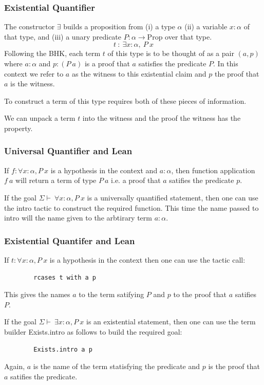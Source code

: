 \documentclass{beamer}
\theoremstyle{indentDefn} \newtheorem{defn}[]{Definition}
\begin{document}
\begin{frame}
	\frametitle{Existential Quantifier}
	
	The constructor $\exists$ builds a proposition from (i) a type $\alpha$ (ii) a variable $x : \alpha$ of that type, and (iii) a unary predicate $P : \alpha \to \text{Prop}$ over that type.
	$$t \ : \ \exists x: \alpha, \ P \ x$$
	Following the BHK, each term $t$ of this type is to be thought of as a pair $(a, p)$ where $a : \alpha$ and $p : (P \ a)$ is a proof that $a$ satisfies the predicate $P$. In this context we refer to $a$ as the witness to this existential claim and $p$ the proof that $a$ is the witness. 
	
	To construct a term of this type requires both of these pieces of information. 
	
	We can unpack a term $t$ into the witness and the proof the witness has the property. 

\end{frame}

\begin{frame}
	\frametitle{Universal Quantifier and Lean}
	
	If $f : \forall x: \alpha, P \ x$ is a hypothesis in the context and $a : \alpha$, then function application $f \ a$ will return a term of type $P \ a$ i.e. a proof that $a$ satifies the predicate $p$. 
	
	If the goal $\Sigma \vdash \ \forall x : \alpha, P \ x$ is a universally quantified statement, then one can use the intro tactic to construct the required function. This time the name passed to intro will the name given to the arbtirary term $a : \alpha$. 
\end{frame}

\begin{frame}[fragile]
	\frametitle{Existential Quantifer and Lean}
	
	If $t : \forall x: \alpha, P \ x$ is a hypothesis in the context then one can use the tactic call: 
		
	\begin{lstlisting}	
		rcases t with a p
	\end{lstlisting}
	
	This gives the names $a$ to the term satifying $P$ and $p$ to the proof that $a$ satifies $P$.
	
	If the goal $\Sigma \vdash \ \exists x : \alpha, P \ x$ is an existential statement, then one can use the term builder Exists.intro as follows to build the required goal:
	
	\begin{lstlisting}
		Exists.intro a p	
	\end{lstlisting}
	
	Again, $a$ is the name of the term statisfying the predicate and $p$ is the proof that $a$ satifies the predicate.
	
\end{frame}
\end{document}
